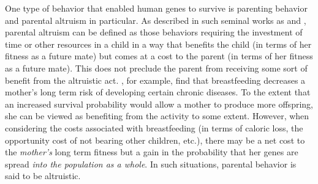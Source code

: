 One type of behavior that enabled human genes to survive is parenting behavior and parental altruism in particular. As described in such seminal works as \citet{Hamilton1964} and \citet{Trivers1974}, parental altruism can be defined as those behaviors requiring the investment of time or other resources in a child in a way that benefits the child (in terms of her fitness as a future mate) but comes at a cost to the parent (in terms of her fitness as a future mate). This does not preclude the parent from receiving some sort of benefit from the altruistic act. \citet{Stuebe2010}, for example, find that breastfeeding decreases a mother's long term risk of developing certain chronic diseases. To the extent that an increased survival probability would allow a mother to produce more offspring, she can be viewed as benefiting from the activity to some extent. However, when considering the costs associated with breastfeeding (in terms of caloric loss, the opportunity cost of not bearing other children, etc.), there may be a net cost to the \emph{mother's} long term fitness but a gain in the probability that her genes are spread \emph{into the population as a whole}. In such situations, parental behavior is said to be altruistic.

